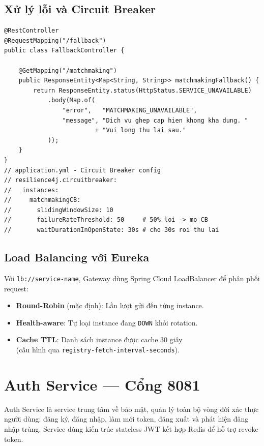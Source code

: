 \documentclass[12pt,a4paper]{report}
\begin{document}
\subsection{Xử lý lỗi và Circuit Breaker}

\begin{lstlisting}[style=javaStyle, caption={Fallback controller khi downstream service không phản hồi}, label={lst:fallback}]
@RestController
@RequestMapping("/fallback")
public class FallbackController {

    @GetMapping("/matchmaking")
    public ResponseEntity<Map<String, String>> matchmakingFallback() {
        return ResponseEntity.status(HttpStatus.SERVICE_UNAVAILABLE)
            .body(Map.of(
                "error",   "MATCHMAKING_UNAVAILABLE",
                "message", "Dich vu ghep cap hien khong kha dung. "
                         + "Vui long thu lai sau."
            ));
    }
}
// application.yml - Circuit Breaker config
// resilience4j.circuitbreaker:
//   instances:
//     matchmakingCB:
//       slidingWindowSize: 10
//       failureRateThreshold: 50     # 50% loi -> mo CB
//       waitDurationInOpenState: 30s # cho 30s roi thu lai
\end{lstlisting}

\subsection{Load Balancing với Eureka}

Với \texttt{lb://service-name}, Gateway dùng Spring Cloud LoadBalancer để phân phối request:

\begin{itemize}
  \item \textbf{Round-Robin} (mặc định): Lần lượt gửi đến từng instance.
  \item \textbf{Health-aware}: Tự loại instance đang \texttt{DOWN} khỏi rotation.
  \item \textbf{Cache TTL}: Danh sách instance được cache 30 giây \\
        (cấu hình qua \texttt{registry-fetch-interval-seconds}).
\end{itemize}

\section{Auth Service --- Cổng 8081}

Auth Service là service trung tâm về bảo mật, quản lý toàn bộ vòng đời xác thực người dùng: đăng ký, đăng nhập, làm mới token, đăng xuất và phát hiện đăng nhập trùng. Service dùng kiến trúc stateless JWT kết hợp Redis để hỗ trợ revoke token.
\end{document}
